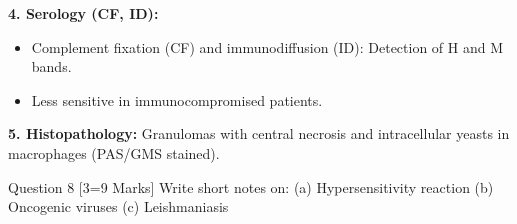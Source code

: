 \documentclass[11pt,a4paper]{article}
\begin{document}
\begin{ansbox}
\textbf{4. Serology (CF, ID):}
\begin{itemize}[leftmargin=*]
    \item Complement fixation (CF) and immunodiffusion (ID): Detection of H and M bands.
    \item Less sensitive in immunocompromised patients.
\end{itemize}

\textbf{5. Histopathology:} Granulomas with central necrosis and intracellular yeasts in macrophages (PAS/GMS stained).
\end{ansbox}

\begin{qbox}{Question 8 [3=9 Marks]}
Write short notes on: (a) Hypersensitivity reaction \quad (b) Oncogenic viruses \quad (c) Leishmaniasis
\end{qbox}
\end{document}
